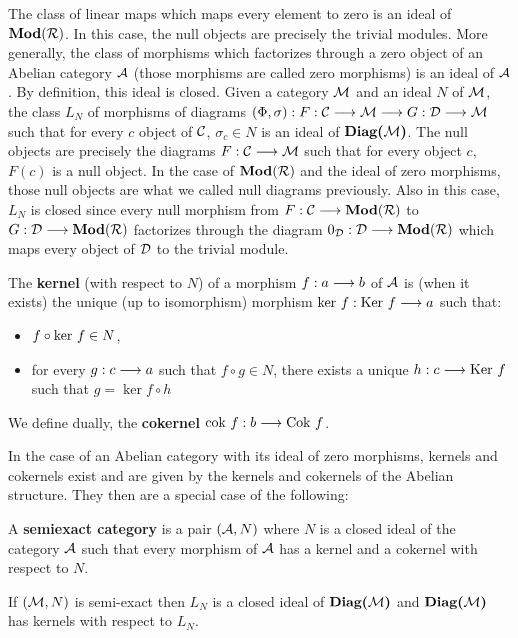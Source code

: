 	The class of linear maps which maps every element to zero is an ideal of $\textbf{Mod}(\mathcal{R})$. In this case, the null objects are precisely the trivial modules. More generally, the class of morphisms which factorizes through a zero object of an Abelian category $\mathcal{A}$ (those morphisms are called zero morphisms) is an ideal of $\mathcal{A}$. By definition, this ideal is closed. Given a category $\mathcal{M}$ and an ideal $N$ of $\mathcal{M}$, the class $L_N$ of morphisms of diagrams $(\Phi,\sigma) : F : \mathcal{C} \longrightarrow \mathcal{M} \longrightarrow G : \mathcal{D} \longrightarrow \mathcal{M}$ such that for every $c$ object of $\mathcal{C}$, $\sigma_c \in N$ is an ideal of $\textbf{Diag(}\mathcal{M}\textbf{)}$. The null objects are precisely the diagrams $F : \mathcal{C} \longrightarrow \mathcal{M}$ such that for every object $c$, $F(c)$ is a null object. In the case of $\textbf{Mod}(\mathcal{R})$ and the ideal of zero morphisms, those null objects are what we called null diagrams previously. Also in this case, $L_N$ is closed since every null morphism from $F : \mathcal{C} \longrightarrow \textbf{Mod}(\mathcal{R})$ to $G : \mathcal{D} \longrightarrow \textbf{Mod}(\mathcal{R})$ factorizes through the diagram $0_{\mathcal{D}} : \mathcal{D} \longrightarrow \textbf{Mod}(\mathcal{R})$ which maps every object of $\mathcal{D}$ to the trivial module.
	
	The \textbf{kernel} (with respect to $N$) of a morphism $f : a \longrightarrow b$ of $\mathcal{A}$ is (when it exists) the unique (up to isomorphism) morphism $\text{ker }f : \text{Ker }f \longrightarrow a$ such that: 
\begin{itemize}
	\item $f \circ \text{ker }f \in N$,
	\item for every $g : c \longrightarrow a$ such that $f \circ g \in N$, there exists a unique $h : c \longrightarrow \text{Ker }f$ such that $g = \ker{f} \circ h$
\end{itemize}
We define dually, the \textbf{cokernel} $\text{cok }f : b \longrightarrow \text{Cok }f$.

	In the case of an Abelian category with its ideal of zero morphisms, kernels and cokernels exist and are given by the kernels and cokernels of the Abelian structure. They then are a special case of the following:
	
	\begin{defi}
	A \textbf{semiexact category} is a pair $(\mathcal{A}, N)$ where $N$ is a closed ideal of the category $\mathcal{A}$ such that every morphism of $\mathcal{A}$ has a kernel and a cokernel with respect to $N$.
	\end{defi}
	
	\begin{lemme} If $(\mathcal{M}, N)$ is semi-exact then $L_N$ is a closed ideal of $\textbf{Diag(}\mathcal{M}\textbf{)}$ and $\textbf{Diag(}\mathcal{M}\textbf{)}$ has kernels with respect to $L_N$.
	\end{lemme}
	
